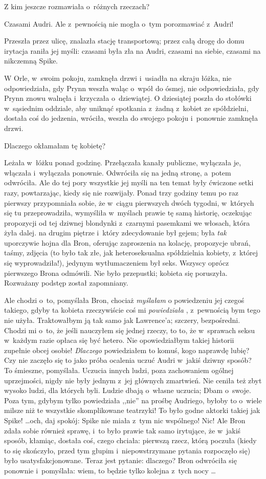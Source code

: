 \documentclass[oneside,polish,11pt,rmheadings]{mwbk}
\begin{document}
Z kim jeszcze rozmawiała o~różnych rzeczach? 

Czasami Audri. Ale z~pewnością nie mogła o~tym porozmawiać z~Audri! 

Przeszła przez ulicę, znalazła stację transportową; przez całą drogę do domu irytacja raniła jej myśli: czasami była zła na Audri, czasami na siebie, czasami na nikczemną Spike. 

W Orle, w~swoim pokoju, zamknęła drzwi i~usiadła na skraju łóżka, nie odpowiedziała, gdy Prynn weszła waląc o~wpół do ósmej, nie odpowiedziała, gdy Prynn znowu walnęła i~krzyczała o~dziewiątej. O dziesiątej poszła do stołówki w~sąsiednim oddziale, aby uniknąć spotkania z~żadną z~kobiet ze spółdzielni, dostała coś do jedzenia, wróciła, weszła do swojego pokoju i~ponownie zamknęła drzwi. 

Dlaczego okłamałam tę kobietę? 

Leżała w~łóżku ponad godzinę. Przełączała kanały publiczne, wyłączała je, włączała i~wyłączała ponownie. Odwróciła się na jedną stronę, a~potem odwróciła. Ale do tej pory wszystkie jej myśli na ten temat były ćwiczone setki razy, powtarzając, kiedy się nie rozwijały. Ponad trzy godziny temu po raz pierwszy przypomniała sobie, że w~ciągu pierwszych dwóch tygodni, w~których się tu przeprowadziła, wymyśliła w~myślach prawie tę samą historię, oczekując propozycji od tej dziwnej blondynki z~czarnymi pasemkami we włosach, która żyła dalej. na drugim piętrze i~który zdecydowanie był gejem; była \textit{tak }uporczywie hojna dla Bron, oferując zaproszenia na kolację, propozycje ubrań, taśmy, zdjęcia (to było tak złe, jak heteroseksualna spółdzielnia kobiety, z~której się wyprowadziła!), jedynym wytłumaczeniem był seks. Wszyscy oprócz pierwszego Brona odmówili. Nie było przepustki; kobieta się poruszyła. Rozważany podstęp został zapomniany. 

Ale chodzi o~to, pomyślała Bron, chociaż \textit{myślałam }o powiedzeniu jej czegoś takiego, gdyby ta kobieta rzeczywiście coś mi \textit{powiedziała }, z~pewnością bym tego nie użyła. Traktowałbym ją tak samo jak Lawrence'a; szczery, bezpośredni. Chodzi mi o~to, że jeśli nauczyłem się jednej rzeczy, to to, że w~sprawach seksu w~każdym razie opłaca się być hetero. Nie opowiedziałbym takiej historii zupełnie obcej osobie! \textit{Dlaczego }powiedziałem to komuś, kogo naprawdę lubię? Czy nie zaczęło się to jako próba ocalenia uczuć Audri w~jakiś dziwny sposób? To śmieszne, pomyślała. Uczucia innych ludzi, poza zachowaniem ogólnej uprzejmości, nigdy nie były jednym z~jej głównych zmartwień. Nie ceniła też zbyt wysoko ludzi, dla których byli. Ludzie dbają o~własne uczucia; Dbam o~swoje. Poza tym, gdybym tylko powiedziała ,,nie'' na prośbę Audriego, byłoby to o~wiele milsze niż te wszystkie skomplikowane teatrzyki! To było godne aktorki takiej jak Spike!  \ldots  och, daj spokój: Spike nie miała z~tym nic wspólnego! Nic! Ale Bron zdała sobie również sprawę, i~to było prawie tak samo irytujące, że w~jakiś sposób, kłamiąc, dostała coś, czego chciała: pierwszą rzecz, którą poczuła (kiedy to się skończyło, przed tym głupim i~niepowstrzymane pytania rozpoczęło się) było usatysfakcjonowane. Teraz jest pytanie: dlaczego? Bron odwróciła się ponownie i~pomyślała: wiem, to będzie tylko kolejna z~tych nocy \ldots  
\end{document}
